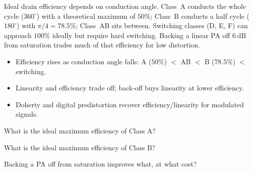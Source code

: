 \begin{workedexample}
Ideal drain efficiency depends on conduction angle. Class~A conducts the
whole cycle ($360^{\circ}$) with a theoretical maximum of $50\%$; Class~B
conducts a half cycle ($180^{\circ}$) with $\pi/4 = 78.5\%$; Class~AB sits
between. Switching classes (D, E, F) can approach $100\%$ ideally but require
hard switching. Backing a linear PA off $6\ \text{dB}$ from saturation trades
much of that efficiency for low distortion.
\end{workedexample}

\begin{keytakeaways}
\begin{itemize}[leftmargin=1.4em,itemsep=2pt]
\item Efficiency rises as conduction angle falls: A ($50\%$) $<$ AB $<$ B ($78.5\%$) $<$ switching.
\item Linearity and efficiency trade off; back-off buys linearity at lower efficiency.
\item Doherty and digital predistortion recover efficiency/linearity for modulated signals.
\end{itemize}
\end{keytakeaways}

\begin{exercises}
\item What is the ideal maximum efficiency of Class A?
\item What is the ideal maximum efficiency of Class B?
\item Backing a PA off from saturation improves what, at what cost?
\end{exercises}

